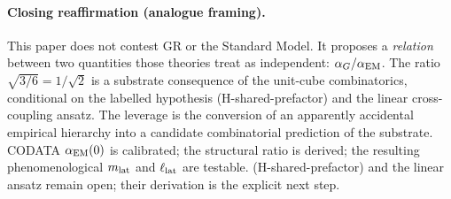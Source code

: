 \documentclass[11pt,a4paper]{article}
\begin{document}
\paragraph{Closing reaffirmation (analogue framing).}
This paper does not contest GR or the Standard Model. It
proposes a \emph{relation} between two quantities those
theories treat as independent: $\alpha_G/\alpha_{\rm EM}$. The
ratio $\sqrt{3/6} = 1/\sqrt{2}$ is a substrate consequence
of the unit-cube combinatorics, conditional on the labelled
hypothesis (H-shared-prefactor) and the linear cross-coupling
ansatz. The leverage is the conversion of an apparently
accidental empirical hierarchy into a candidate combinatorial
prediction of the substrate. CODATA $\alpha_{\rm EM}(0)$ is
calibrated; the structural ratio is derived; the resulting
phenomenological $m_{\rm lat}$ and $\ell_{\rm lat}$ are
testable. (H-shared-prefactor) and the linear ansatz remain
open; their derivation is the explicit next step.
\end{document}

